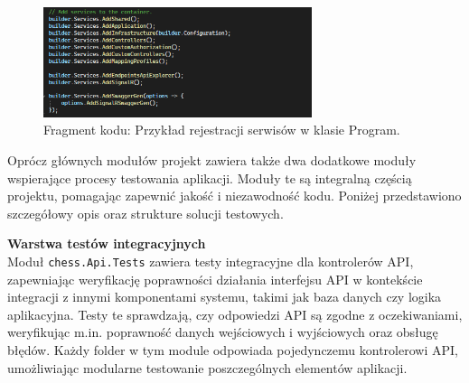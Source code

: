 \documentclass[12pt,a4paper]{article}
\begin{document}
\vspace{0.5cm}
\begin{figure}[h!]
    \centering
    \includegraphics[width=0.7\textwidth]{images/ex_add_services.png}
    \caption{Fragment kodu: Przykład rejestracji serwisów w klasie Program.}
\end{figure}
\vspace{0.5cm}

\noindent 
Oprócz głównych modułów projekt zawiera także dwa dodatkowe moduły wspierające procesy testowania aplikacji. Moduły te są integralną częścią projektu, pomagając zapewnić jakość i niezawodność kodu. Poniżej przedstawiono szczegółowy opis oraz strukture solucji testowych.

\newpage

\noindent \textbf{Warstwa testów integracyjnych}\\
Moduł \texttt{chess.Api.Tests} zawiera testy integracyjne dla kontrolerów API, zapewniając weryfikację poprawności działania interfejsu API w kontekście integracji z innymi komponentami systemu, takimi jak baza danych czy logika aplikacyjna. Testy te sprawdzają, czy odpowiedzi API są zgodne z oczekiwaniami, weryfikując m.in. poprawność danych wejściowych i wyjściowych oraz obsługę błędów. Każdy folder w tym module odpowiada pojedynczemu kontrolerowi API, umożliwiając modularne testowanie poszczególnych elementów aplikacji.
\end{document}

